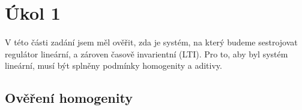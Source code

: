 \documentclass{article}
\begin{document}
    \prefrontmatter
    \newpage
    \tableofcontents
    \begingroup
        \let\clearpage\relax
        \vspace*{20pt}
        \listoftables
        \vspace*{20pt}
        \listoffigures
        \vspace*{20pt}
    \endgroup
    \addtolength{\parskip}{\baselineskip}
    \renewcommand{\sectionmark}[1]{\markright{\ #1}}
   	\newpage

	\section{Úkol 1}
	   	\paragraph{} 
	   	V této části zadání jsem měl ověřit, zda je systém, na který budeme sestrojovat regulátor lineární, a zároven časově invarientní (LTI). Pro to, aby byl systém lineární, musí být splněny podmínky homogenity a aditivy.
	   	\subsection{Ověření homogenity}
\end{document}
